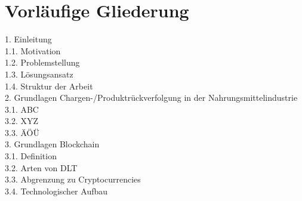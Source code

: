 \section{Vorläufige Gliederung}
\begin{small}
	1. Einleitung\\
	\noindent\hspace*{10mm}%
	1.1. Motivation\\
	\noindent\hspace*{10mm}%
	1.2. Problemstellung\\
	\noindent\hspace*{10mm}%
	1.3. Lösungsansatz\\
	\noindent\hspace*{10mm}%
	1.4. Struktur der Arbeit\\
	2. Grundlagen Chargen-/Produktrückverfolgung in der Nahrungsmittelindustrie\\
	\noindent\hspace*{10mm}%
	3.1. ABC\\
	\noindent\hspace*{10mm}%
	3.2. XYZ\\
	\noindent\hspace*{10mm}%
	3.3. ÄÖÜ\\
	3. Grundlagen Blockchain\\
	\noindent\hspace*{10mm}%
	3.1. Definition\\
	\noindent\hspace*{10mm}%
	3.2. Arten von DLT\\
	\noindent\hspace*{10mm}%
	3.3. Abgrenzung zu Cryptocurrencies\\
	\noindent\hspace*{10mm}%
	3.4. Technologischer Aufbau\\

\end{small}
